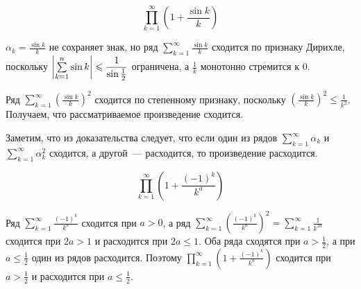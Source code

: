 \documentclass[../../main.tex]{subfiles}
\begin{document}
	\begin{example}
		\[\prod\limits_{k = 1}^{\infty} \left(1 + \frac{\sin k}{k}\right)\]
		
		$\alpha_k = \frac{\sin k}{k}$ не сохраняет знак, но ряд $\sum\limits_{k = 
		1}^{\infty} \frac{\sin k}{k}$ сходится по признаку Дирихле, поскольку ${\left|{ 
		\sum\limits_{k = 1}^{n} \sin k}\right| \leqslant \dfrac{1}{\sin \frac{1}{2}}}$ 
		ограничена, а $\frac{1}{k}$ монотонно стремится к $0$.
		
		Ряд $\sum\limits_{k = 1}^{\infty} \left(\frac{\sin k}{k}\right)^2$ сходится по степенному признаку, 
		поскольку $\left(\frac{\sin k}{k}\right)^2 \leq \frac{1}{k^2}$.
		Получаем, что 
		рассматриваемое произведение сходится.
	\end{example}

	Заметим, что из доказательства следует, что если один из рядов 
	$\sum\limits_{k = 1}^{\infty} \alpha_k$ и $\sum\limits_{k = 1}^{\infty} 
	\alpha_k^2$ сходится, а другой~--- расходится, то произведение расходится.
	
	\begin{example}


		\[\prod\limits_{k = 1}^{\infty} \left(1 + \frac{(-1)^k}{k^a}\right)\]
		
		Ряд $\sum\limits_{k = 1}^{\infty} \frac{(-1)^k}{k^a}$ сходится при $a > 0$, 
		а ряд $\sum\limits_{k = 1}^{\infty} \left(\frac{(-1)^k}{k^a}\right)^2 = 
		\sum\limits_{k = 1}^{\infty} \frac{1}{k^{2a}}$ сходится при $2a > 1$ и 
		расходится при $2a \leq 1$. Оба ряда сходятся при $a > \frac{1}{2}$, а при $a 
		\leq \frac{1}{2}$ один из рядов расходится. Поэтому $\prod\limits_{k = 1}^{\infty} 
		\left(1 + \frac{(-1)^k}{k^a}\right)$ сходится при $a > \frac{1}{2}$ и
		расходится при $a \leq \frac{1}{2}$.
	\end{example}
	
\end{document}
